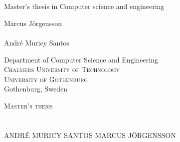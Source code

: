 
{ %


\begin{titlepage}
			
\addtolength{\voffset}{2cm}

\begin{figure}[H]
\centering
\vspace{1cm}	%
\end{figure}

\mbox{}
\vfill
\renewcommand{\familydefault}{\sfdefault} \normalfont %

\textbf{\Huge \multiLineTitle{0.2cm}} 
\\[0.5cm]

{\Large \oneLineSubtitle}\\[0.5cm]


Master's thesis in Computer science and engineering \setlength{\parskip}{1cm}

{\Large Marcus Jörgensson} \setlength{\parskip}{2.9cm}
\\
\\
{\Large André Muricy Santos} \setlength{\parskip}{2.9cm}

Department of Computer Science and Engineering \\
\textsc{Chalmers University of Technology} \\
\textsc{University of Gothenburg} \\
Gothenburg, Sweden \the\year

\renewcommand{\familydefault}{\rmdefault} \normalfont %
\end{titlepage}


\newpage
\restoregeometry
\thispagestyle{empty}
\mbox{}


\newpage
\thispagestyle{empty}
\begin{center}
	\textsc{\large Master's thesis \the\year}\\[4cm]		%
	\textbf{\Large \multiLineTitle{0.2cm}} \\[1cm]
	{\large \oneLineSubtitle}\\[1cm]
	{\large ANDRÉ MURICY SANTOS}
        {\large MARCUS JÖRGENSSON}
	

\end{center}}
